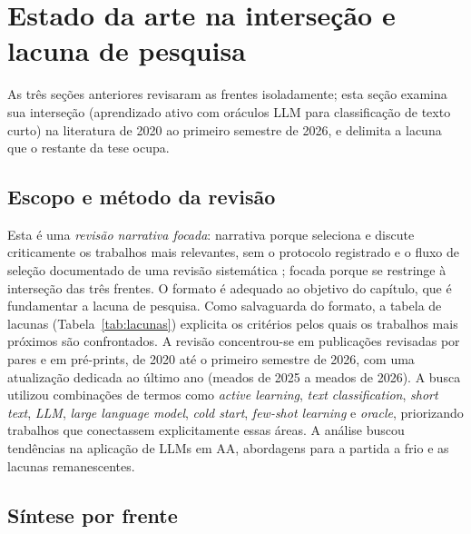 \section{Estado da arte na interseção e lacuna de pesquisa}
\label{sec:fund-soa}

As três seções anteriores revisaram as frentes isoladamente; esta seção
examina sua interseção (aprendizado ativo com oráculos LLM para classificação
de texto curto) na literatura de 2020 ao primeiro semestre de 2026, e
delimita a lacuna que o restante da tese ocupa.

\subsection{Escopo e método da revisão}
\label{sec:revisao_sistematica_focada}

Esta é uma \emph{revisão narrativa focada}: narrativa porque seleciona e
discute criticamente os trabalhos mais relevantes, sem o protocolo
registrado e o fluxo de seleção documentado de uma revisão sistemática
\citep{Kitchenham2004}; focada porque se restringe à interseção das três
frentes. O formato é adequado ao objetivo do capítulo, que é fundamentar a
lacuna de pesquisa. Como salvaguarda do formato, a tabela de lacunas
(Tabela~\ref{tab:lacunas}) explicita os critérios pelos quais os trabalhos
mais próximos são confrontados. A revisão concentrou-se em publicações
revisadas por pares e em pré-prints, de 2020 até o primeiro semestre de
2026, com uma atualização dedicada ao último ano (meados de 2025 a meados
de 2026). A busca
utilizou combinações de termos como \textit{active learning}, \textit{text
classification}, \textit{short text}, \textit{LLM}, \textit{large language
model}, \textit{cold start}, \textit{few-shot learning} e \textit{oracle},
priorizando trabalhos que conectassem explicitamente essas áreas. A análise
buscou tendências na aplicação de LLMs em AA, abordagens para a partida a
frio e as lacunas remanescentes.

\subsection{Síntese por frente}
\label{sec:integracao_llm_al}

